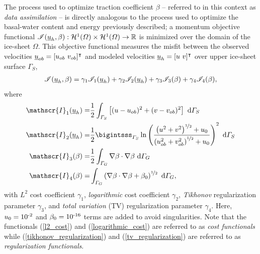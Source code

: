 The process used to optimize traction coefficient $\beta$ -- referred to in this context as  \emph{data assimilation} -- is directly analogous to the process used to optimize the basal-water content and energy previously described; a momentum objective functional  $\mathscr{I}(\underline{u}_h, \beta) : \mathcal{H}^1(\varOmega) \times \mathcal{H}^1(\varOmega) \rightarrow \mathbb{R}$ is minimized over the domain of the ice-sheet $\Omega$.  This objective functional measures the misfit between the observed velocities $\rankone{u}_{ob} = [u_{ob}\ v_{ob}]^\intercal$ and modeled velocities $\underline{u}_h = [u\ v]^\intercal$ over upper ice-sheet surface $\Gamma_S$,
\begin{align}
  \label{momentum_objective}
  \mathscr{I}(\underline{u}_h, \beta) = \gamma_1 \mathscr{I}_1(\underline{u}_h)
                                   + \gamma_2 \mathscr{I}_2(\underline{u}_h)
                                   + \gamma_3 \mathscr{I}_3(\beta)
                                   + \gamma_4 \mathscr{I}_4(\beta),
\end{align}
where
\begin{align}
  \label{l2_cost}
  \mathscr{I}_1(\rankone{u}_h) = 
    & \frac{1}{2} \int_{\Gamma_S} \left[ (u - u_{ob})^2 + (v - v_{ob})^2 \right] \d{\Gamma_S} \\ 
  \label{logarithmic_cost}
  \mathscr{I}_2(\rankone{u}_h) = 
    & \frac{1}{2} \bigintsss_{\Gamma_S} \ln\left( \frac{ \left(u^2 + v^2\right)^{\nicefrac{1}{2}} + u_0}{\left(u_{ob}^2 + v_{ob}^2\right)^{\nicefrac{1}{2}} + u_0} \right)^2 \d{\Gamma_S} \\ 
  \label{tikhonov_regularization}
  \mathscr{I}_3(\beta) = 
    & \frac{1}{2} \int_{\Gamma_G} \nabla \beta \cdot \nabla \beta \d{\Gamma_G} \\
  \label{tv_regularization}
  \mathscr{I}_4(\beta) = 
    & \int_{\Gamma_G} \left( \nabla \beta \cdot \nabla \beta + \beta_0 \right)^{\nicefrac{1}{2}} \d{\Gamma_G},
\end{align}
with $L^2$ cost coefficient $\gamma_1$, \emph{logarithmic} cost coefficient $\gamma_2$,  \emph{Tikhonov} regularization parameter $\gamma_3$, and  \emph{total variation} (TV) regularization parameter $\gamma_4$.  Here, $u_0 = 10^{\textrm{-2}}$ and $\beta_0 = 10^{\textrm{-16}}$ terms are added to avoid singularities.  Note that the functionals (\ref{l2_cost}) and (\ref{logarithmic_cost}) are referred to as  \emph{cost functionals} while (\ref{tikhonov_regularization}) and (\ref{tv_regularization}) are referred to as \emph{regularization functionals}.


